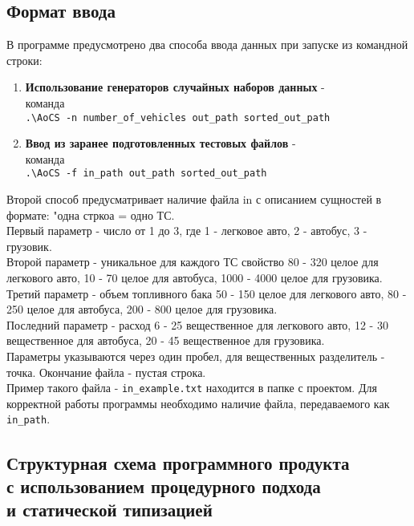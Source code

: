 \documentclass[a4paper]{article}
\begin{document}
\subsection*{Формат ввода}
В программе предусмотрено два способа ввода данных при запуске из командной строки:
\begin{enumerate} 
    \item \textbf{Использование генераторов случайных наборов данных} - \\команда \\\verb|.\AoCS -n number_of_vehicles out_path sorted_out_path|
    
    \item \textbf{Ввод из заранее подготовленных тестовых
    файлов} - \\команда \\\verb|.\AoCS -f in_path out_path sorted_out_path|
\end{enumerate}

Второй способ предусматривает наличие файла in с описанием сущностей в формате:
"одна стркоа = одно ТС.\\
Первый параметр - число от 1 до 3, где 1 - легковое авто, 2 - автобус, 3 - грузовик.\\
Второй параметр - уникальное для каждого ТС свойство
80 - 320 целое для легкового авто, 10 - 70 целое для автобуса, 1000 - 4000 целое для грузовика.\\
Третий параметр - объем топливного бака
50 - 150 целое для легкового авто, 80 - 250 целое для автобуса, 200 - 800 целое для грузовика.\\
Последний параметр - расход
6 - 25 вещественное для легкового авто, 12 - 30 вещественное для автобуса, 20 - 45 вещественное для грузовика.\\
Параметры указываются через один пробел, для вещественных разделитель - точка. Окончание файла - пустая строка.\\
Пример такого файла - \verb|in_example.txt| находится в папке с проектом. Для корректной работы программы необходимо наличие файла, передаваемого как \verb|in_path|.
\newpage
\begin{center}

\section*{Структурная схема программного продукта\\с использованием процедурного подхода\\ и статической типизацией}
\end{center}
\end{document}
